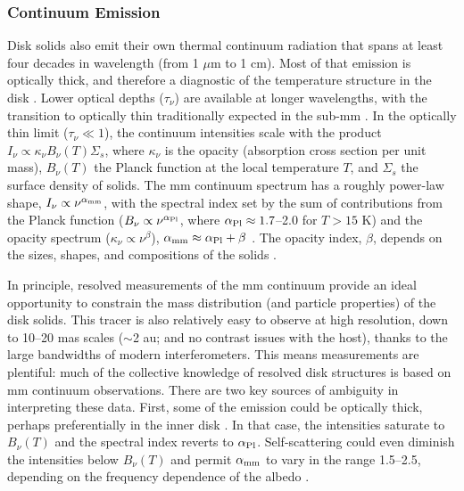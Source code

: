 \documentclass[a4paper]{ar-1col}
\begin{document}
\subsubsection{Continuum Emission}
Disk solids also emit their own thermal continuum radiation that spans at least four decades in wavelength (from 1 $\mu$m to 1 cm).  Most of that emission is optically thick, and therefore a diagnostic of the temperature structure in the disk \citep[e.g., see][]{andrews15}.  Lower optical depths ($\tau_\nu$) are available at longer wavelengths, with the transition to optically thin traditionally expected in the sub-mm \citep{beckwith90}.  In the optically thin limit ($\tau_\nu \ll 1$), the continuum intensities scale with the product $I_\nu \propto \kappa_\nu B_\nu(T) \Sigma_s$, where $\kappa_\nu$ is the opacity (absorption cross section per unit mass), $B_\nu(T)$ the Planck function at the local temperature $T$, and $\Sigma_s$ the surface density of solids.  The mm continuum spectrum has a roughly power-law shape, $I_\nu \propto \nu^{\alpha_{\rm mm}}$, with the spectral index set by the sum of contributions from the Planck function ($B_\nu \propto \nu^{\alpha_{\rm Pl}}$, where $\alpha_{\rm Pl} \approx 1.7$--2.0 for $T > 15$ K) and the opacity spectrum ($\kappa_\nu \propto \nu^\beta$), $\alpha_{\rm mm} \approx \alpha_{\rm Pl} + \beta$ \citep{beckwith91,ricci10a,ricci10b}.  The opacity index, $\beta$, depends on the sizes, shapes, and compositions of the solids \citep{miyake93,dalessio01,draine06}.  

In principle, resolved measurements of the mm continuum provide an ideal opportunity to constrain the mass distribution (and particle properties) of the disk solids.  This tracer is also relatively easy to observe at high resolution, down to 10--20 mas scales ($\sim$2 au; and no contrast issues with the host), thanks to the large bandwidths of modern interferometers.  This means measurements are plentiful: much of the collective knowledge of resolved disk structures is based on mm continuum observations.  There are two key sources of ambiguity in interpreting these data.  First, some of the emission could be optically thick, perhaps preferentially in the inner disk \citep[see][]{beckwith90,aw05}.  In that case, the intensities saturate to $B_\nu(T)$ and the spectral index reverts to $\alpha_{\rm Pl}$.  Self-scattering could even diminish the intensities below $B_\nu(T)$ and permit $\alpha_{\rm mm}$ to vary in the range 1.5--2.5, depending on the frequency dependence of the albedo \citep{zhu19,liu19}.
\end{document}
